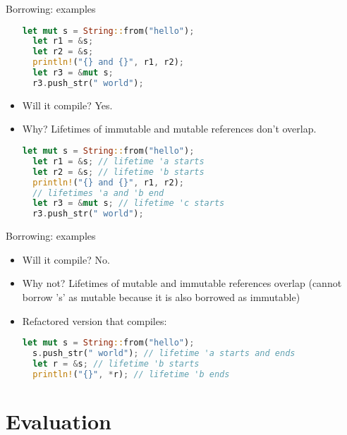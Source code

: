 \documentclass{beamer}
\begin{document}
\begin{frame}[fragile]{Borrowing: examples}
\begin{itemize}
  \begin{lstlisting}[language=Rust]
  let mut s = String::from("hello");
  let r1 = &s;
  let r2 = &s;
  println!("{} and {}", r1, r2);
  let r3 = &mut s;
  r3.push_str(" world");
  \end{lstlisting}

  \item Will it compile? \pause Yes.
  \item Why? \pause Lifetimes of immutable and mutable references don't overlap.

  \begin{lstlisting}[language=Rust]
  let mut s = String::from("hello");
  let r1 = &s; // lifetime 'a starts
  let r2 = &s; // lifetime 'b starts
  println!("{} and {}", r1, r2);
  // lifetimes 'a and 'b end
  let r3 = &mut s; // lifetime 'c starts
  r3.push_str(" world");
  \end{lstlisting}
\end{itemize}
\end{frame}


\begin{frame}[fragile]{Borrowing: examples}
\begin{itemize}
  \begin{lstlisting}[language=Rust]
  let mut s = String::from("hello");
  let r = &s;
  s.push_str(" world");
  println!("{}", *r);
  \end{lstlisting}

  \item Will it compile? \pause No.
  \item Why not? \pause Lifetimes of mutable and immutable references overlap (cannot borrow 's' as mutable because it is also borrowed as immutable)
  \item Refactored version that compiles:\pause

  \begin{lstlisting}[language=Rust]
  let mut s = String::from("hello");
  s.push_str(" world"); // lifetime 'a starts and ends
  let r = &s; // lifetime 'b starts
  println!("{}", *r); // lifetime 'b ends
  \end{lstlisting}
\end{itemize}
\end{frame}


\section{Evaluation}
\end{document}
